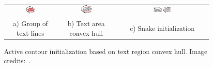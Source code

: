 	\begin{figure}[!ht]%
	\begin{center}
	  \begin{tabular}{ccc}
	  \includegraphics[trim= 0mm 0mm 0mm 0mm, clip, width=0.20\textwidth]{group_lines.png}&
	  \includegraphics[trim= 0mm 0mm 0mm 0mm, clip, width=0.20\textwidth]{convex_hull.png}&
	  \includegraphics[trim= 48mm 0mm 0mm 0mm, clip, width=0.20\textwidth]{snake_init.png} \\ 
	  \footnotesize a) Group of text lines	& \footnotesize b) Text area convex hull 	& \footnotesize c) Snake initialization 
	  \end{tabular}
	\caption[Active contour initialization based on text region convex hull]{Active contour initialization based on text region convex hull. Image credits:~\cite{Bubble09}.}
		\label{fig:se:paragraphs}
	\end{center}
	\end{figure}	



